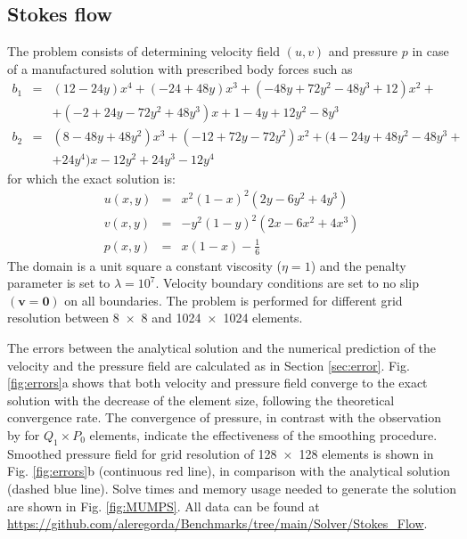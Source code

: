 \documentclass[hidelinks,10pt,a4paper]{article}
\begin{document}
\subsection{Stokes flow}\label{sec:stokes}
The problem consists of determining velocity field $(u,v)$ and pressure $p$ in case of a manufactured solution with prescribed body forces such as
\begin{eqnarray}
b_1&=&(12-24y)x^4+(-24+48y)x^3+(-48y+72y^2-48y^3+12)x^2+\nonumber \\
&&+(-2+24y-72y^2+48y^3)x+1-4y+12y^2-8y^3\nonumber \\
b_2&=&(8-48y+48y^2)x^3+(-12+72y-72y^2)x^2+(4-24y+48y^2-48y^3+\nonumber \\
&&+24y^4)x-12y^2+24y^3-12y^4\nonumber
\end{eqnarray}
for which the exact solution is:
\begin{eqnarray}
u(x,y)&=&x^2(1-x)^2(2y-6y^2+4y^3)\nonumber \\
v(x,y)&=&-y^2(1-y)^2(2x-6x^2+4x^3)\nonumber \\
p(x,y)&=&x(1-x)-\frac{1}{6}\nonumber
\end{eqnarray}
The domain is a unit square a constant viscosity ($\eta=1$) and the penalty parameter is set to $\lambda=10^7$. Velocity boundary conditions are set to no slip
$(\bm{v}=\bm{0})$ on all boundaries. The problem is performed for different grid resolution between \num{8x8} and \num{1024x1024} elements.

The errors between the analytical solution and the numerical prediction of the velocity and the pressure field are calculated as in Section \ref{sec:error}.
Fig. \ref{fig:errors}a shows that both velocity and pressure field converge to the exact solution with the decrease of the element size, following the
theoretical convergence rate. The convergence of pressure, in contrast with the observation by \citet{Donea2003} for $Q_1 \times P_0$ elements, indicate the
effectiveness of the smoothing procedure. Smoothed pressure field for grid resolution of \num{128x128} elements is shown in Fig. \ref{fig:errors}b (continuous
red line), in comparison with the analytical solution (dashed blue line). Solve times and memory usage needed to generate the solution are shown in
Fig. \ref{fig:MUMPS}. All data can be found at \url{https://github.com/aleregorda/Benchmarks/tree/main/Solver/Stokes_Flow}.
\end{document}
